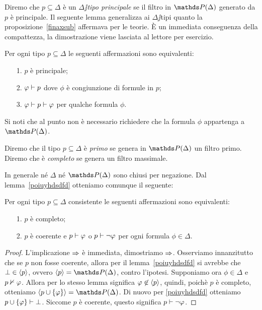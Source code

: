 Diremo che $p\subseteq\Delta$ \`e un \emph{$\Delta\jj$tipo principale\/} se il filtro in $\PP(\Delta)$ generato da $p$ \`e principale. Il seguente lemma generalizza ai $\Delta\jj$tipi quanto la proposizione~\ref{finaxsub} affermava per le teorie. \`E un immediata conseguenza della compattezza, la dimostrazione viene lasciata al lettore per esercizio.

\begin{lemma}
Per ogni tipo $p\subseteq\Delta$ le seguenti affermazioni sono equivalenti:
\begin{itemize}
\item[1.] $p$ \`e principale;
\item[2.] $\varphi\vdash p$ dove $\phi$ \`e congiunzione di formule in $p$;
\item[3.] $\varphi\vdash p\vdash \varphi$ per qualche formula $\phi$.\QED 
\end{itemize}
\end{lemma}

Si noti che al punto  non \`e necessario richiedere che la formula $\phi$ appartenga a $\PP(\Delta)$. 

\begin{definition}
Diremo che il tipo $p\subseteq\Delta$ \`e \emph{primo\/} se genera in $\PP(\Delta)$ un filtro primo. Diremo che \`e \emph{completo\/} se genera un filtro massimale. \end{definition}

In generale n\'e $\Delta$ n\'e $\PP(\Delta)$ sono chiusi per negazione. Dal lemma~\ref{poiuyhdsdfd} otteniamo comunque il seguente: 

\begin{corollary}\label{coroll_test_primalita}
Per ogni tipo $p\subseteq\Delta$ consistente le seguenti affermazioni sono equivalenti:
\begin{itemize}
\item[1.] $p$ \`e completo;
\item[2.] $p$ \`e coerente e $p\vdash\varphi$ o $p\vdash\neg\varphi$ per ogni formula $\phi\in\Delta$.
\end{itemize}
\end{corollary}
\begin{proof}
L'implicazione $\Rightarrow$ \`e immediata, dimostriamo $\Rightarrow$. Osserviamo innanzitutto che se $p$ non fosse coerente, allora per il lemma~\ref{poiuyhdsdfd} si avrebbe che $\bot \in \langle p\rangle$, ovvero $\<p\>=\PP(\Delta)$, contro l'ipotesi. Supponiamo ora $\phi\in\Delta$ e $p\nvdash\varphi$. Allora per lo stesso lemma significa $\varphi\not\in \langle p\rangle$, quindi, poich\`e $p$ \`e completo, otteniamo $\<p \cup \{\phi\}\>=\PP(\Delta)$. Di nuovo per \ref{poiuyhdsdfd} otteniamo $p \cup \{\varphi\} \vdash \bot$. Siccome $p$ \`e coerente, questo significa $p \vdash \neg\varphi$.
\end{proof}

